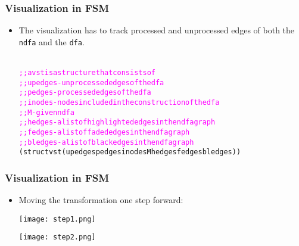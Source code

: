 \documentclass{beamer}
\newcommand{\dfa}{\texttt{dfa}}
\newcommand{\ndfa}{\texttt{ndfa}}
\begin{document}
\begin{frame}[fragile]
\frametitle{Visualization in FSM}
\begin{scriptsize}
\begin{itemize}

\item<1-> The visualization has to track processed and unprocessed edges of both the \ndfa{} and the \dfa{}. \newline


\begin{alltt}
\textcolor{magenta}{
;; a vst is a structure that consists of
;; upedges - unprocessed edges of the \dfa{}
;; pedges - processed edges of the \dfa{}
;; inodes - nodes included in the construction of the \dfa{}
;; M - given \ndfa{}
;; hedges - a list of highlighted edges in the ndfa graph
;; fedges - a list of faded edges in the ndfa graph
;; bledges - a list of black edges in the ndfa graph} \newline
(struct vst (upedges pedges inodes M hedges fedges bledges))
\end{alltt}



\end{itemize}
\end{scriptsize}
\end{frame}

\begin{frame}[fragile]
\frametitle{Visualization in FSM}
\begin{scriptsize}
\begin{itemize}
\normalsize

\item<1-> Moving the transformation one step forward: \newline



\noindent
\begin{minipage}[t]{0.48\linewidth}
\centering
\texttt{[image: step1.png]}
\end{minipage}
\hfill
\begin{minipage}[t]{0.48\linewidth}
\centering
\texttt{[image: step2.png]}
\end{minipage}




\end{itemize}
\end{scriptsize}
\end{frame}
\end{document}
